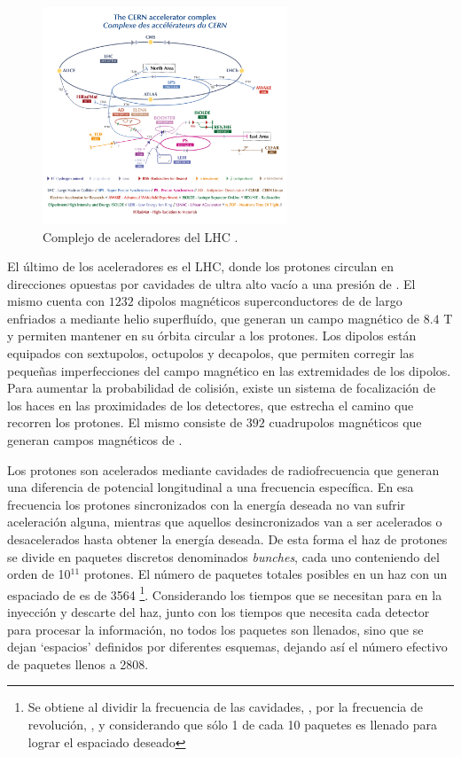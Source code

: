 \begin{figure}
  \centering
  \includegraphics[width=0.65\textwidth]{images/lhc/LHC_complex.png}
  \caption{Complejo de aceleradores del LHC \cite{Lopienska:2800984}.}
  \label{fig:LHC_complex}
\end{figure}

El último de los aceleradores es el LHC, donde los protones circulan en direcciones opuestas por cavidades de ultra alto vacío a una presión de . El mismo cuenta con $1232$ dipolos magnéticos superconductores de  de largo enfriados a  mediante helio superfluído, que generan un campo magnético de $8.4$ T y permiten mantener en su órbita circular a los protones. Los dipolos están equipados con sextupolos, octupolos y decapolos, que permiten corregir las pequeñas imperfecciones del campo magnético en las extremidades de los dipolos. Para aumentar la probabilidad de colisión, existe un sistema de focalización de los haces en las proximidades de los detectores, que estrecha el camino que recorren los protones. El mismo consiste de $392$ cuadrupolos magnéticos que generan campos magnéticos de .

Los protones son acelerados mediante cavidades de radiofrecuencia que generan una diferencia de potencial longitudinal a una frecuencia específica. En esa frecuencia los protones sincronizados con la energía deseada no van sufrir aceleración alguna, mientras que aquellos desincronizados van a ser acelerados o desacelerados hasta obtener la energía deseada. De esta forma el haz de protones se divide en paquetes discretos denominados \textit{bunches}, cada uno conteniendo del orden de 10$^{11}$ protones. El número de paquetes totales posibles en un haz con un espaciado de  es de 3564 \footnote{Se obtiene al dividir la frecuencia de las cavidades, , por la frecuencia de revolución, , y considerando que sólo 1 de cada 10 paquetes es llenado para lograr el espaciado deseado}. Considerando los tiempos que se necesitan para en la inyección y descarte del haz, junto con los tiempos que necesita cada detector para procesar la información, no todos los paquetes son llenados, sino que se dejan `espacios' definidos por diferentes esquemas, dejando así el número efectivo de paquetes llenos a 2808.

